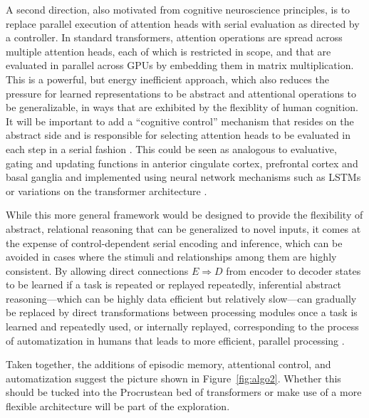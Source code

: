 A second direction, also motivated from cognitive neuroscience principles, is to replace 
parallel execution of attention heads with serial evaluation as directed by a controller. 
In standard transformers, attention operations are spread across multiple attention heads,
each of which is restricted in scope, and that are evaluated in parallel across GPUs by embedding them in matrix
multiplication. This is a powerful, but energy inefficient approach, which also reduces the pressure for learned
representations to be abstract and attentional operations to be generalizable, in ways that are exhibited
by the flexiblity of human cognition.  It will be important to add a ``cognitive control'' mechanism that resides on
the abstract side and is responsible for selecting attention heads to be evaluated in each step in a serial fashion \citep{cohen2017cognitive}.  This could be seen as analogous to evaluative, gating and updating functions in anterior cingulate cortex, prefrontal cortex and basal ganglia
\citep{frank2001interactions,evc,braver2000control}
and implemented using neural network mechanisms such as LSTMs \citep{lstm} or variations on the transformer
architecture \citep{gamr}.

While this more general framework would be designed to provide the flexibility of abstract, relational reasoning that
can be generalized to novel inputs, it comes at the expense of control-dependent serial encoding and inference, which can be avoided in cases where the stimuli and relationships among them are highly consistent. By allowing
direct connections $E \Rightarrow D$ from encoder to decoder states to be learned if a task is repeated or replayed
repeatedly, inferential abstract reasoning---which can be highly data efficient but relatively slow---can gradually
be replaced by direct transformations between processing modules once a task is learned and repeatedly used, or
internally replayed, corresponding to the process of automatization in humans that leads to more efficient, parallel
processing \citep{schneider1977controlled, ravi2020navigating, musslick2021rationalizing}.  

Taken together, the additions of episodic memory, attentional control, and automatization suggest the picture shown in Figure~\ref{fig:algo2}. Whether this should be tucked into the Procrustean bed of transformers or make use of a more flexible architecture will be part of the exploration.


